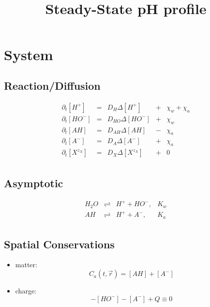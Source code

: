 \documentclass[aps,12pt]{revtex4}
\begin{document}
\title{Steady-State pH profile}
\maketitle

\section{System}

\subsection{Reaction/Diffusion}
\begin{equation}
\begin{array}{rclcl}
	\partial_t [H^+]  & = & D_H \Delta [H^+]     &+&\chi_w+\chi_a\\
	\partial_t [HO^-] & = & D_{HO} \Delta [HO^-] &+&\chi_w\\
	\partial_t [AH]   & = & D_{AH} \Delta [AH]   &-&\chi_a\\
	\partial_t [A^-]  & = & D_{A} \Delta [A^-] &+& \chi_a\\
	\partial_t [X^{z_X}] & = & D_X \Delta [X^{z_X}] &+& 0\\
\end{array}
\end{equation}

\subsection{Asymptotic}
\begin{equation}
	\begin{array}{rcll}
	H_2O  & \rightleftharpoons & H^+ + HO^-, & K_w\\
	AH    & \rightleftharpoons & H^+ + A^-,  & K_a\\
	\end{array}
\end{equation}

\subsection{Spatial Conservations}

\begin{itemize}
\item matter:
\begin{equation}
	C_a(t,\vec r) = [AH] + [A^-]
\end{equation}

\item charge:
\begin{equation}
	[H^+]-[HO^-]-[A^-]+Q\equiv0
\end{equation}

\end{itemize}
\end{document}
